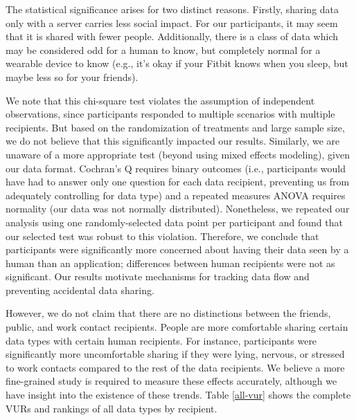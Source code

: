 \documentclass[conference]{IEEEtran}
\begin{document}
The statistical significance arises for two distinct reasons. Firstly, sharing data only with a server carries less social impact. For our participants, it may seem that it is shared with fewer people. Additionally, there is a class of data which may be considered odd for a human to know, but completely normal for a wearable device to know (e.g., it's okay if your Fitbit knows when you sleep, but maybe less so for your friends).

We note that this chi-square test violates the assumption of independent observations, since participants responded to multiple scenarios with multiple recipients. But based on the randomization of treatments and large sample size, we do not believe that this significantly impacted our results. Similarly, we are unaware of a more appropriate test (beyond using mixed effects modeling), given our data format. Cochran's Q requires binary outcomes (i.e., participants would have had to answer only one question for each data recipient, preventing us from adequately controlling for data type) and a repeated measures ANOVA requires normality (our data was not normally distributed). Nonetheless, we repeated our analysis using one randomly-selected data point per participant and found that our selected test was robust to this violation. Therefore, we conclude that participants were significantly more concerned about having their data seen by a human than an application; differences between human recipients were not as significant. Our results motivate mechanisms for tracking data flow and preventing accidental data sharing.

However, we do not claim that there are no distinctions between the friends, public, and work contact recipients. People are more comfortable sharing certain data types with certain human recipients. For instance, participants were significantly more uncomfortable sharing if they were lying, nervous, or stressed to work contacts compared to the rest of the data recipients. We believe a more fine-grained study is required to measure these effects accurately, although we have insight into the existence of these trends. Table \ref{all-vur} shows the complete VURs and rankings of all data types by recipient.
\end{document}
